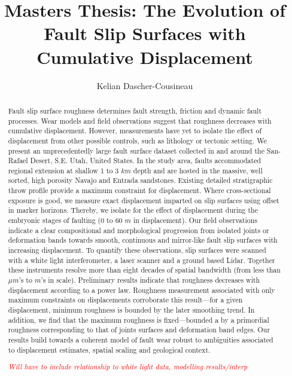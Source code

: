 \documentclass[12pt,a4paper]{article}
\author{Kelian Dascher-Cousineau}
\title{Masters Thesis: The Evolution of Fault Slip Surfaces with Cumulative Displacement}
\begin{document}
\maketitle

\begin{abstract}

Fault slip surface roughness determines fault strength, friction and dynamic fault processes. Wear models and field observations suggest that roughness decreases with cumulative displacement. However, measurements have yet to isolate the effect of displacement from other possible controls, such as lithology or tectonic setting. We present an unprecedentedly large fault surface dataset collected in and around the San-Rafael Desert, S.E. Utah, United States. In the study area, faults accommodated regional extension at shallow 1 to 3 $km$ depth and are hosted in the massive, well sorted, high porosity Navajo and Entrada sandstones. Existing detailed stratigraphic throw profile provide a maximum constraint for displacement. Where cross-sectional exposure is good, we measure exact displacement imparted on slip surfaces using offset in marker horizons. Thereby, we isolate for the effect of displacement during the embryonic stages of faulting (0 to 60 $m$ in displacement). Our field observations indicate a clear compositional and morphological progression from isolated joints or deformation bands towards smooth, continuous and mirror-like fault slip surfaces with increasing displacement. To quantify these observations, slip surfaces were scanned with a white light interferometer, a laser scanner and a ground based Lidar. Together these instruments resolve more than eight decades of spatial bandwidth (from less than $\mu m$'s to $m$'s in scale). Preliminary results indicate that roughness decreases with displacement according to a power law. Roughness measurement associated with only maximum constraints on displacements corroborate this result—for a given displacement, minimum roughness is bounded by the later smoothing trend. In addition, we find that the maximum roughness is fixed—bounded a by a primordial roughness corresponding to that of joints surfaces and deformation band edges. Our results build towards a coherent model of fault wear robust to ambiguities associated to displacement estimates, spatial scaling and geological context.

\textcolor{red}{\textit{Will have to include relationship to white light data, modelling results/interp}}

\end{abstract}
\end{document}
